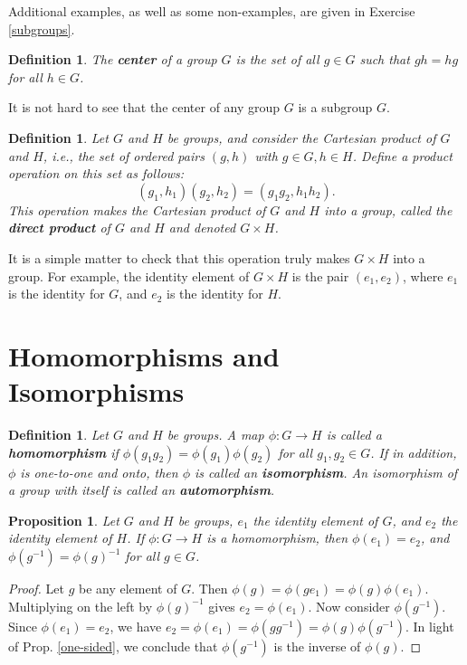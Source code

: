 \documentclass{amsbook}
\theoremstyle{plain}
\newtheorem{definition}[theorem]{Definition}
\newtheorem{proposition}[theorem]{Proposition}
\numberwithin{equation}{chapter}
\numberwithin{theorem}{chapter}
\begin{document}
Additional examples, as well as some non-examples, are given in Exercise
\ref{subgroups}.

\begin{definition}
The \textbf{center} of a group $G$ is the set of all $g\in G$ such that
$gh=hg$ for all $h\in G$.
\end{definition}

It is not hard to see that the center of any group $G$ is a subgroup $G$.

\begin{definition}
Let $G$ and $H$ be groups, and consider the Cartesian product of $G$ and $H$,
i.e., the set of ordered pairs $(g,h)$ with $g\in G,h\in H$. Define a product
operation on this set as follows:
\[
(g_{1},h_{1})(g_{2},h_{2})=(g_{1}g_{2},h_{1}h_{2})\text{.}%
\]
This operation makes the Cartesian product of $G$ and $H$ into a group, called
the \textbf{direct product} of $G$ and $H$ and denoted $G\times H$.
\end{definition}

It is a simple matter to check that this operation truly makes $G\times H$
into a group. For example, the identity element of $G\times H$ is the pair
$(e_{1},e_{2})$, where $e_{1}$ is the identity for $G$, and $e_{2}$ is the
identity for $H$.

\section{Homomorphisms and Isomorphisms}

\begin{definition}
Let $G$ and $H$ be groups. A map $\phi:G\rightarrow H$ is called a
\textbf{homomorphism} if $\phi(g_{1}g_{2})=\phi(g_{1})\phi(g_{2})$ for all
$g_{1},g_{2}\in G$. If in addition, $\phi$ is one-to-one and onto, then $\phi$
is called an \textbf{isomorphism}. An isomorphism of a group with itself is
called an \textbf{automorphism}.
\end{definition}

\begin{proposition}
Let $G$ and $H$ be groups, $e_{1}$ the identity element of $G$, and $e_{2}$
the identity element of $H$. If $\phi:G\rightarrow H$ is a homomorphism, then
$\phi(e_{1})=e_{2}$, and $\phi(g^{-1})=\phi(g)^{-1}$ for all $g\in G$.
\end{proposition}

\begin{proof}
Let $g$ be any element of $G$. Then $\phi(g)=\phi(ge_{1})=\phi(g)\phi(e_{1})$.
Multiplying on the left by $\phi(g)^{-1}$ gives $e_{2}=\phi(e_{1})$. Now
consider $\phi(g^{-1})$. Since $\phi(e_{1})=e_{2}$, we have $e_{2}=\phi
(e_{1})=\phi(gg^{-1})=\phi(g)\phi(g^{-1})$. In light of Prop. \ref{one-sided},
we conclude that $\phi(g^{-1})$ is the inverse of $\phi(g)$.
\end{proof}
\end{document}
